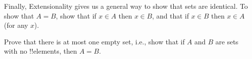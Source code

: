 
Finally, Extensionality gives us a general way to show that sets are identical. To show that $A= B$, show that if $x \in A$ then $x \in B$, and that if $x \in B$ then $x \in A$ (for any $x$).
\begin{prob}
Prove that there is at most one empty set, i.e., show that if $A$ and $B$ are sets with no !!{element}s, then $A = B$.
\end{prob}
